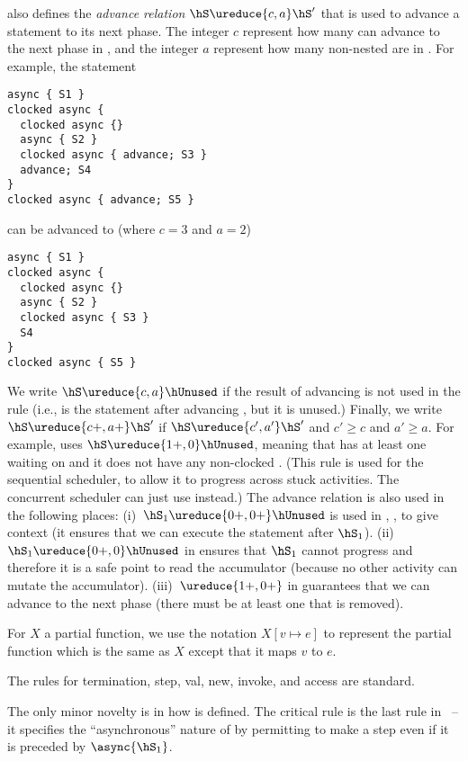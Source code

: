  also defines the \emph{advance relation} $\hS \ureduce{c,a} \hS'$
    that is used to advance a statement to its next phase.
The integer $c$ represent how many  can advance to the next phase in \hS,
    and the integer $a$ represent how many non-nested  are in \hS.
For example, the statement
\begin{lstlisting}
async { S1 }
clocked async {
  clocked async {}
  async { S2 }
  clocked async { advance; S3 }
  advance; S4
}
clocked async { advance; S5 }
\end{lstlisting}
can be advanced to (where $c=3$ and $a=2$)
\begin{lstlisting}
async { S1 }
clocked async {
  clocked async {}
  async { S2 }
  clocked async { S3 }
  S4
}
clocked async { S5 }
\end{lstlisting}
We write  $\hS \ureduce{c,a} \hUnused$ if the result of advancing \hS is not used in the rule
    (i.e., \hUnused is the statement after advancing \hS, but it is unused.)
Finally, we write $\hS \ureduce{c+,a+} \hS'$ if $\hS \ureduce{c',a'} \hS'$ and $c'\geq c$ and $a' \geq a$.
For example,  uses $\hS \ureduce{1+,0} \hUnused$,
    meaning that \hS has at least one  waiting on \xadvance
    and it does not have any non-clocked .
(This rule is used for the sequential scheduler, to allow it to progress across stuck activities.
    The concurrent scheduler can just use  instead.)
The advance relation is also used in the following places:
(i)~$\hS_1 \ureduce{0+,0+} \hUnused$ is used in , , 
    to give context (it ensures that we can execute the statement after $\hS_1$).
(ii)~$\hS_1 \ureduce{0+,0} \hUnused$ in  ensures that $\hS_1$ cannot progress
    and therefore it is a safe point to read the accumulator (because no other activity can mutate the accumulator).
(iii)~$\ureduce{1+,0+}$ in  guarantees that we can advance to the next phase
    (there must be at least one \xadvance that is removed).


For $X$ a partial function, we use the notation
$X[v \mapsto e]$ to represent the partial function which is the same
as $X$ except that it maps $v$ to $e$.

The rules for termination, step, val, new, invoke, and access
are standard.

The only minor novelty is in how \hasync{} is
defined. The critical rule is the last rule in~ -- it
specifies the ``asynchronous'' nature of \hasync{} by permitting \hS{}
to make a step even if it is preceded by $\async{\hS_1}$.

